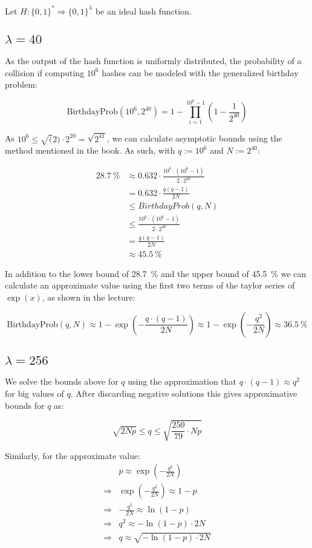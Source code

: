 \documentclass[a4paper]{scrreprt}
\begin{document}
Let $H: \{0, 1\}^{*} \Rightarrow \{0, 1\}^\lambda$ be an ideal hash function.

\subsection{$\lambda = 40$}

As the output of the hash function is uniformly distributed, the probability of
a collision if computing $10^6$ hashes can be modeled with the generalized
birthday problem:

\[
	\text{BirthdayProb}(10^6, 2^{40}) = 1 - \prod_{i = 1}^{10^6 - 1} \left(1 - \frac{1}{2^{40}}\right)
\]

As $10^6 \leq \sqrt(2) \cdot 2^{20} = \sqrt{2^{41}}$, we can calculate
asymptotic bounds using the method mentioned in the book. As such, with $q :=
10^6$ and $N := 2^{40}$:

\begin{align*}
	\SI{28.7}{\percent} & \approx 0.632 \cdot \frac{10^6 \cdot (10^6 - 1)}{2 \cdot 2^{40}} \\
			    & = 0.632 \cdot \frac{q (q-1)}{2N}  \\
			    & \leq BirthdayProb(q, N) \\ 
			    & \leq \frac{10^6 \cdot (10^6 - 1)}{2 \cdot 2^{40}} \\
			    & = \frac{q (q-1)}{2N}  \\
			    & \approx \SI{45.5}{\percent}
\end{align*}

In addition to the lower bound of \SI{28.7}{\percent} and the upper bound of
\SI{45.5}{\percent} we can calculate an approximate value using the first two
terms of the taylor series of $\exp(x)$, as shown in the lecture:

\[
	\text{BirthdayProb}(q, N) \approx 1 - \exp(-\frac{q \cdot (q - 1)}{2
	N}) \approx 1 - \exp(-\frac{q^2}{2 N}) \approx \SI{36.5}{\percent}
\]

\subsection{$\lambda = 256$}

We solve the bounds above for $q$ using the approximation that $q \cdot (q-1)
\approx q^2$ for big values of $q$. After discarding negative solutions this
gives approximative bounds for $q$ as:


\[
	\sqrt{2 N p} \leq q \leq \sqrt{\frac{250}{79} \cdot N p}
\]

Similarly, for the approximate value:
\begin{align*}
	& p \approx \exp(- \frac{q^2}{2N}) \\
	\Rightarrow & \exp(- \frac{q^2}{2N}) \approx 1 - p \\
	\Rightarrow & -\frac{q^2}{2N} \approx \ln(1 - p) \\
	\Rightarrow & q^2 \approx -\ln(1 - p) \cdot 2N \\
	\Rightarrow & q \approx \sqrt{-\ln(1 - p) \cdot 2N}
\end{align*}
\end{document}
